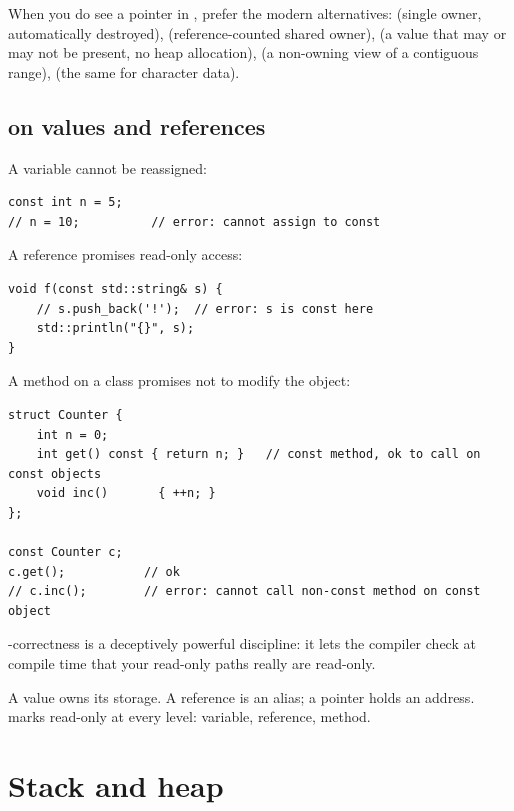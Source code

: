 When you do see a pointer in \maya{}, prefer the modern alternatives:
 (single owner, automatically destroyed),
 (reference-counted shared owner),
 (a value that may or may not be present, no
heap allocation),  (a non-owning view of a
contiguous range),  (the same for character
data).

\subsection{ on values and references}

A  variable cannot be reassigned:

\begin{lstlisting}
const int n = 5;
// n = 10;          // error: cannot assign to const
\end{lstlisting}

A  reference promises read-only access:

\begin{lstlisting}
void f(const std::string& s) {
    // s.push_back('!');  // error: s is const here
    std::println("{}", s);
}
\end{lstlisting}

A  method on a class promises not to modify the object:

\begin{lstlisting}
struct Counter {
    int n = 0;
    int get() const { return n; }   // const method, ok to call on const objects
    void inc()       { ++n; }
};

const Counter c;
c.get();           // ok
// c.inc();        // error: cannot call non-const method on const object
\end{lstlisting}

-correctness is a deceptively powerful discipline: it
lets the compiler check at compile time that your read-only paths
really are read-only.

\begin{recap}
A value owns its storage. A reference is an alias; a pointer holds
an address.  marks read-only at every level: variable,
reference, method.
\end{recap}

\section{Stack and heap}
\label{sec:cpp:stack-heap}


